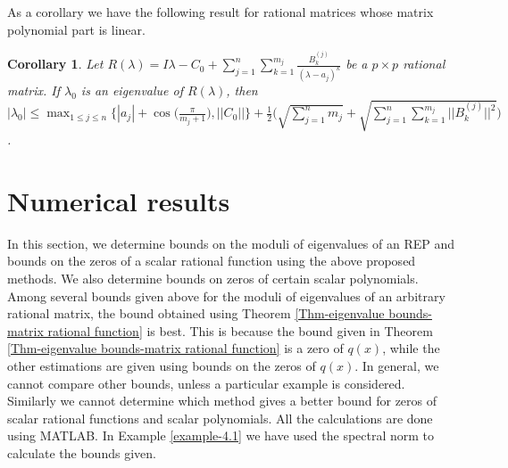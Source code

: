 \documentclass[12pt, reqno]{amsart}
\newtheorem{corollary}[theorem]{Corollary}
\theoremstyle{definition}
\theoremstyle{remark}
\numberwithin{equation}{section}
\begin{document}
\medskip
As a corollary we have the following result for rational matrices whose matrix 
polynomial part is linear.

\begin{corollary}\label{Cor-bound for eigenvalue-linear}
Let $R(\lambda) = I \lambda  - C_0 + \displaystyle \sum_{j=1}^{n} \sum_{k=1}^{m_j} 
\frac{B_k^{(j)}}{(\lambda-a_j)^k}$ be a $p\times p$ rational matrix. If 
$\lambda_0$ is an eigenvalue of $R(\lambda)$, then $|\lambda_0| \leq \displaystyle  
\max_{1\leq j \leq n} \Big\{|a_j| + \cos\bigg(\frac{\pi}{m_j+1}\bigg), ||C_0|| \Big\} + 
\frac{1}{2} \Bigg( \sqrt{\sum _{j=1}^{n}m_j} + \sqrt{\sum_{j=1}^{n} 
\sum_{k=1}^{m_j}||B_k^{(j)}||^{2}} \Bigg)$.
\end{corollary}

\medskip
\section{Numerical results}\label{sec-4}\hspace*{\fill}
 
In this section, we determine bounds on the moduli of eigenvalues of an 
REP and bounds on the zeros of a scalar rational function using the above proposed 
methods. We also determine bounds on zeros of certain scalar polynomials. Among 
several bounds given above for the moduli of eigenvalues of an arbitrary rational 
matrix, the bound obtained using Theorem \ref{Thm-eigenvalue bounds-matrix rational function} 
is best. This is because the bound given in Theorem 
\ref{Thm-eigenvalue bounds-matrix rational function} is a zero of $q(x)$, 
while the other estimations are given using bounds on the zeros of $q(x)$. In 
general, we cannot compare other bounds, unless a particular example is considered. 
Similarly we cannot determine which method gives a better bound for zeros of scalar 
rational functions and scalar polynomials. All the calculations are done using MATLAB. 
In Example \ref{example-4.1} we have used the spectral norm to calculate the bounds given.   
\end{document}
